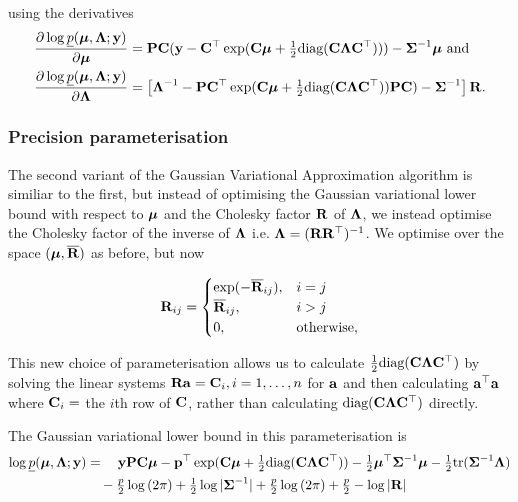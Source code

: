 \documentclass[times, doublespace]{anzsauth}
\begin{document}
	using the derivatives
	\begin{align*}
		\frac{\partial \log \underline{p}({\boldsymbol \mu}, {\boldsymbol \Lambda}; {\bf y})}{\partial {\boldsymbol\mu}}     & = {\bf P} {\bf C} ({\bf y} - {\bf C}^\top \exp({\bf C} {\boldsymbol \mu} + \tfrac{1}{2} \text{diag}{({\bf C}{\boldsymbol\Lambda}{\bf C}^\top)})) - {\boldsymbol \Sigma}^{-1} {\boldsymbol \mu} \text{ and}                \\
		\frac{\partial \log \underline{p}({\boldsymbol \mu}, {\boldsymbol \Lambda}; {\bf y})}{\partial {\boldsymbol\Lambda}} & = \left [{\boldsymbol \Lambda}^{-1} - {\bf P} {\bf C}^\top \exp({\bf C} {\boldsymbol \mu} + \tfrac{1}{2} \text{diag}({\bf C} {\boldsymbol \Lambda} {\bf C}^\top)) {\bf P} {\bf C}) - {\boldsymbol \Sigma}^{-1} \right ] {\bf R}. 
	\end{align*}
		
	\subsubsection{Precision parameterisation}
		
	\noindent The second variant of the Gaussian Variational Approximation algorithm is similiar to the first, but
	instead of optimising the Gaussian variational lower bound with respect to ${\boldsymbol \mu}$ and the Cholesky factor
	${\bf R}$ of ${\boldsymbol \Lambda}$, we instead optimise the Cholesky factor of the inverse of ${\boldsymbol \Lambda}$ i.e. ${\boldsymbol \Lambda} =
	({\bf R} {\bf R}^\top)^{-1}$. We optimise over the space $({\boldsymbol \mu}, \overline{{\bf R}})$ as before, but now 
		
	\begin{equation*}
		{\bf R}_{ij} =
		\begin{cases}
			\exp(-\overline{{\bf R}}_{ij}), & i = j             \\
			\overline{{\bf R}}_{ij},        & i > j             \\
			0,                          & \text{otherwise}, 
		\end{cases}
	\end{equation*}
	
	\noindent This new choice of parameterisation allows us to calculate $\tfrac{1}{2} \text{diag}({\bf C} {\boldsymbol \Lambda}
	{\bf C}^\top)$ by solving the linear systems ${\bf R} {\bf a} = {\bf C}_{i}, i=1, \ldots, n$ for   ${\bf a}$ and then calculating
	${\bf a}^\top{\bf a}$ where ${\bf C}_{i} = $ the $i$th row of ${\bf C}$, rather than calculating $\text{diag}({\bf C} {\boldsymbol \Lambda}
	{\bf C}^\top)$ directly.
		
	\noindent The Gaussian variational lower bound in this parameterisation is
	\begin{align*}
		\log \underline{p}({\boldsymbol \mu}, {\boldsymbol \Lambda}; {\bf y}) & = \quad {\bf y}{\bf P}{\bf C} {\boldsymbol\mu} - {\bf p}^\top \exp({\bf C} {\boldsymbol \mu} + \tfrac{1}{2} \text{diag}({\bf C} {\boldsymbol \Lambda} {\bf C}^\top)) - \tfrac{1}{2} {\boldsymbol \mu}^\top {\boldsymbol\Sigma}^{-1} {\boldsymbol \mu} - \tfrac{1}{2} \text{tr}{({\boldsymbol\Sigma}^{-1} {\boldsymbol\Lambda})} \\
		                                        & \quad- \tfrac{p}{2} \log{(2 \pi)} + \tfrac{1}{2} \log{|{\boldsymbol\Sigma}^{-1}|} + \tfrac{p}{2} \log{(2 \pi)} + \tfrac{p}{2} - \log{|{\bf R}|}                                             
	\end{align*}
		
\end{document}
